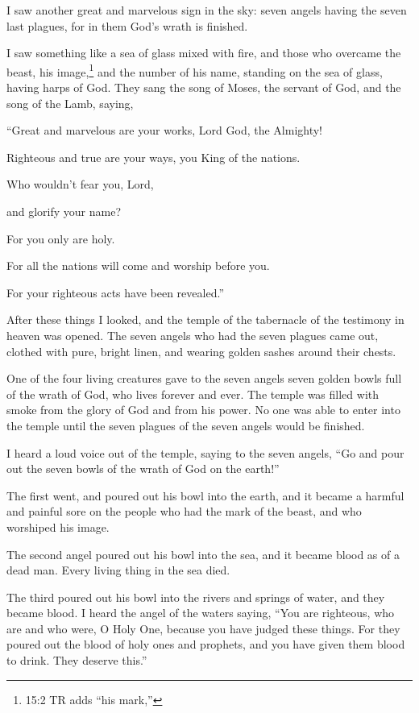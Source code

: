 \mychapter{} \myverse*{}I saw another great and marvelous sign in the sky: seven angels
having the seven last plagues, for in them God’s wrath is finished.

\myverse{}I saw something like a sea of glass mixed with fire, and those
who overcame the beast, his image,\footnote{15:2 TR adds “his mark,”} and the number of his name, standing on the sea of glass, having
harps of God.
\myverse{}They sang the song of Moses, the servant of God, and the song of the Lamb,
saying,

“Great and marvelous are your works, Lord God, the Almighty!

Righteous and true are your ways, you King of the nations.

\myverse{}Who wouldn’t fear you, Lord,

and glorify your name?

For you only are holy.

For all the nations will come and worship before you.

For your righteous acts have been revealed.”

\myverse{}After these things I looked, and the temple of the tabernacle
of the testimony in heaven was opened.
\myverse{}The seven angels who had the seven plagues came out, clothed with pure, bright
linen, and wearing golden sashes around their chests.

\myverse{}One of the four living creatures gave to the seven angels seven
golden bowls full of the wrath of God, who lives forever and ever.
\myverse{}The temple was filled with smoke from the glory of God and from his power.
No one was able to enter into the temple until the seven plagues of the seven angels would be finished.



\mychapter{} \myverse*{}I heard a loud voice out of the temple, saying to the seven angels,
“Go and pour out the seven bowls of the wrath of God on the earth!”

\myverse{}The first went, and poured out his bowl into the earth, and it
became a harmful and painful sore on the people who had the mark of the beast, and who worshiped his image.

\myverse{}The second angel poured out his bowl into the sea, and it became
blood as of a dead man. Every living thing in the sea died.

\myverse{}The third poured out his bowl into the rivers and springs of water,
and they became blood.
\myverse{}I heard the angel of the waters saying, “You are righteous, who are and who
were, O Holy One, because you have judged these things.
\myverse{}For they poured out the blood of holy ones and prophets, and you have given
them blood to drink. They deserve this.”

